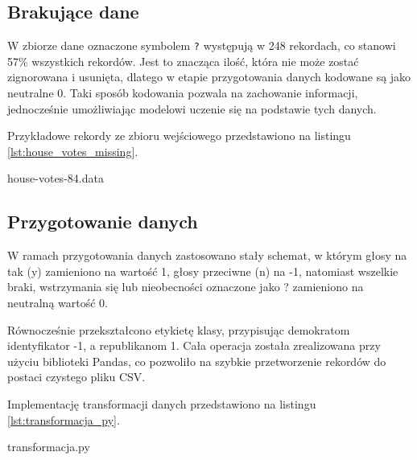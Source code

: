 \documentclass[12pt,twoside]{article}
\begin{document}
\subsection{Brakujące dane}
W zbiorze dane oznaczone symbolem \texttt{?} występują w 248 rekordach, co stanowi 57\% wszystkich rekordów. Jest to znacząca ilość, która nie może zostać zignorowana i usunięta, dlatego w etapie przygotowania danych kodowane są jako neutralne 0. Taki sposób kodowania pozwala na zachowanie informacji, jednocześnie umożliwiając modelowi uczenie się na podstawie tych danych.

Przykładowe rekordy ze zbioru wejściowego przedstawiono na listingu \ref{lst:house_votes_missing}.

\begin{samepage}
\begin{center}
\begin{minipage}{\linewidth}

 {house-votes-84.data}

\end{minipage}
\end{center}
\end{samepage}

\subsection{Przygotowanie danych}
W ramach przygotowania danych zastosowano stały schemat, w którym głosy na tak (y) zamieniono na wartość 1, głosy przeciwne (n) na -1, natomiast wszelkie braki, wstrzymania się lub nieobecności oznaczone jako ? zamieniono na neutralną wartość 0.

Równocześnie przekształcono etykietę klasy, przypisując demokratom identyfikator -1, a republikanom 1. Cała operacja została zrealizowana przy użyciu biblioteki Pandas, co pozwoliło na szybkie przetworzenie rekordów do postaci czystego pliku CSV.

Implementację transformacji danych przedstawiono na listingu \ref{lst:transformacja_py}.



 {transformacja.py}
\end{document}
